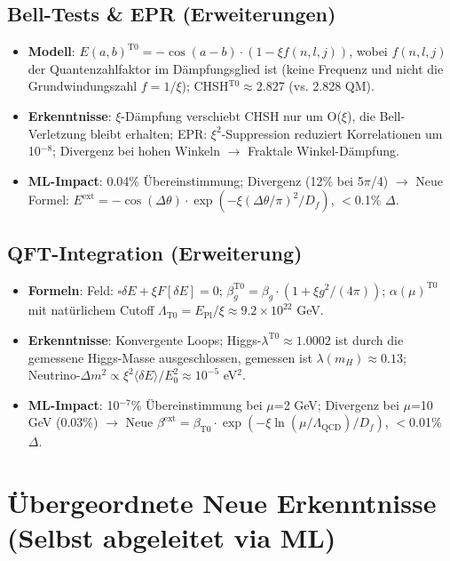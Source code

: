 	\subsection{Bell-Tests \& EPR (Erweiterungen)}
	
	\begin{itemize}
		\item \textbf{Modell}: $E(a,b)^{\text{T0}} = -\cos(a-b) \cdot (1 - \xi f(n,l,j))$, wobei $f(n,l,j)$ der Quantenzahlfaktor im Dämpfungsglied ist (keine Frequenz und nicht die Grundwindungszahl $f = 1/\xi$); CHSH$^{\text{T0}} \approx 2.827$ (vs. 2.828 QM).
		\item \textbf{Erkenntnisse}: $\xi$-Dämpfung verschiebt CHSH nur um O($\xi$), die Bell-Verletzung bleibt erhalten; EPR: $\xi^2$-Suppression reduziert Korrelationen um 10$^{-8}$; Divergenz bei hohen Winkeln $\to$ Fraktale Winkel-Dämpfung.
		\item \textbf{ML-Impact}: 0.04\% Übereinstimmung; Divergenz (12\% bei 5$\pi$/4) $\to$ Neue Formel: $E^\text{ext} = -\cos(\Delta\theta) \cdot \exp(-\xi (\Delta\theta/\pi)^2 / D_f)$, $<$0.1\% $\Delta$.
	\end{itemize}
	
	\subsection{QFT-Integration (Erweiterung)}
	
	\begin{itemize}
		\item \textbf{Formeln}: Feld: $\square \delta E + \xi F[\delta E] = 0$; $\beta_g^{\text{T0}} = \beta_g \cdot (1 + \xi g^2/(4\pi))$; $\alpha(\mu)^{\text{T0}}$ mit natürlichem Cutoff $\Lambda_{\text{T0}} = E_{\text{Pl}} / \xi \approx 9.2\times10^{22}$ GeV.
		\item \textbf{Erkenntnisse}: Konvergente Loops; Higgs-$\lambda^{\text{T0}} \approx 1.0002$ ist durch die gemessene Higgs-Masse ausgeschlossen, gemessen ist $\lambda(m_H) \approx 0.13$; Neutrino-$\Delta m^2 \propto \xi^2 \langle\delta E\rangle / E_0^2 \approx 10^{-5}$ eV$^2$.
		\item \textbf{ML-Impact}: 10$^{-7}$\% Übereinstimmung bei $\mu$=2 GeV; Divergenz bei $\mu$=10 GeV (0.03\%) $\to$ Neue $\beta^\text{ext} = \beta_{\text{T0}} \cdot \exp(-\xi \ln(\mu/\Lambda_{\text{QCD}})/D_f)$, $<$0.01\% $\Delta$.
	\end{itemize}
	
	\section{Übergeordnete Neue Erkenntnisse (Selbst abgeleitet via ML)}
	
